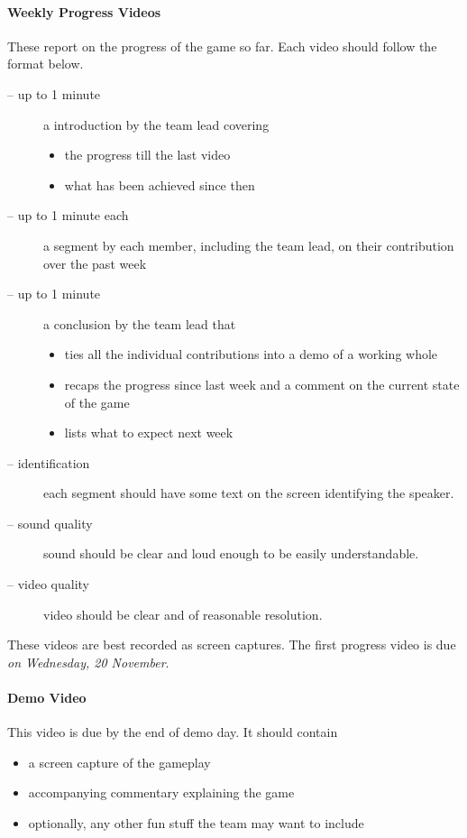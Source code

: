 \documentclass[addpoints]{exam}
\begin{document}
\begin{questions}
\paragraph{Weekly Progress Videos} These report on the progress of the game so far. Each video should follow the format below.
\begin{description}
\item[-- up to 1 minute] a introduction by the team lead covering
  \begin{itemize}
  \item the progress till the last video
  \item what has been achieved since then
  \end{itemize}
\item[-- up to 1 minute each] a segment by each member, including the team lead, on their contribution over the past week
\item[-- up to 1 minute] a conclusion by the team lead that
  \begin{itemize}
  \item ties all the individual contributions into a demo of a working whole
  \item recaps the progress since last week and a comment on the current state of the game
  \item lists what to expect next week
  \end{itemize}
\item[-- identification] each segment should have some text on the screen identifying the speaker.
\item[-- sound quality] sound should be clear and loud enough to be easily understandable. 
\item[-- video quality] video should be clear and of reasonable resolution.
\end{description}
These videos are best recorded as screen captures. The first progress video is due \textit{on Wednesday, 20 November}.

\paragraph{Demo Video} This video is due by the end of demo day. It should contain
\begin{itemize}
\item a screen capture of the gameplay
\item accompanying commentary explaining the game
\item optionally, any other fun stuff the team may want to include
\end{itemize}


\end{questions}
\end{document}
